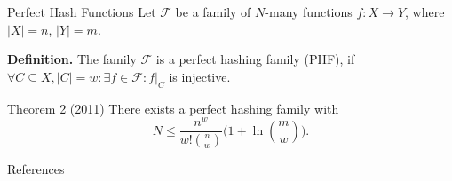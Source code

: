 \documentclass[10pt]{beamer}
\newcommand\restr[2]{\ensuremath{\left.#1\right|_{#2}}}
\begin{document}
\begin{frame}[fragile]{Perfect Hash Functions}
    Let $ \mathcal{F} $ be a family of $ N $-many functions $ f : X \to Y $, where
    $ |X| = n $, $ |Y| = m $.
    
    \textbf{Definition.} The family $ \mathcal{F} $ is a perfect hashing family (PHF), if
    $ \forall C \subseteq X, |C| = w: \exists f \in \mathcal{F}: \restr{f}{C} $ is injective.

    \vfill

    \begin{block}{Theorem 2 (2011)}
        There exists a perfect hashing family with
        \[
            N \leq \frac{n^w}{w!{n \choose w}}\bigg(1 + \ln{m \choose w}\bigg).
        \]
    \end{block}
\end{frame}




\begin{frame}[fragile]{References}
    \nocite{*}
    
    
\end{frame}
\end{document}

